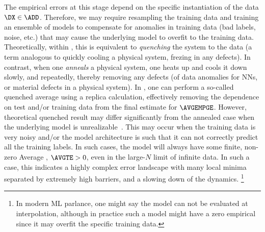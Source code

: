 The empirical errors at this stage depend on the specific instantiation of the data  $\DX\in\ADD$.
Therefore, we may require resampling the training data and training an ensemble of models to compensate for anomalies in training data (bad labels, noise, etc.) that may cause the underlying model to overfit to the training data.
Theoretically, within \SMOG, this is equivalent to \emph{quenching} the system to the data (a term analogous to quickly cooling a physical system, frezing in any defects).
In contrast, when one \emph{anneals} a physical system, one heats up and cools it down slowly, and repeatedly, thereby removing any defects (of data anomalies for NNs, or material defects in a physical system).
In \STATMECH, one can perform a so-called quenched average using a replica calculation,
effectively removing the dependence on test and/or training data
from the final estimate for $\AVGEMPGE$.
However, theoretical quenched result may differ significantly from the annealed case when the underlying model is unrealizable~\cite{SST92}. 
This may occur when the training data is very noisy and/or the model architecture is such that it can not correctly predict all the training labels.
In such cases, the model will always have some finite, non-zero Average \TrainingError, $\AVGTE > 0$,
even in the large-$N$ limit of infinite data.  In such a case, this indicates
a highly complex error landscape with many local minima separated by extremely high barriers,
and a slowing down of the dynamics.%
\footnote{In modern ML parlance, one might say the model can not be evaluated at interpolation, although 
in practice such a model might have a zero empirical \TrainingError since it may overfit the specific training data.}

